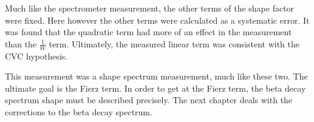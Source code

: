 \documentclass[main.tex]{subfiles}
\begin{document}
Much like the spectrometer measurement, the other terms of the shape factor were fixed.
Here however the other terms were calculated as a systematic error.
It was found that the quadratic term had more of an effect in the measurement than the $\frac{1}{W}$ term.
Ultimately, the measured linear term was consistent with the CVC hypothesis. 

This measurement was a shape spectrum measurement, much like these two.
The ultimate goal is the Fierz term. 
In order to get at the Fierz term, the beta decay spectrum shape must be described precisely.
The next chapter deals with the corrections to the beta decay spectrum.  
\end{document}
